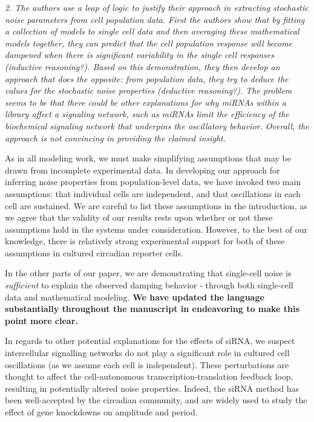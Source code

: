 \documentclass[11pt, letterpaper]{article}
\newenvironment{reviewer}{\itshape\color{gray}}{}
\begin{document}
\begin{reviewer}
2. The authors use a leap of logic to justify their approach in extracting stochastic noise parameters from cell population data. First the authors show that by fitting a collection of models to single cell data and then averaging these mathematical models together, they can predict that the cell population response will become dampened when there is significant variability in the single cell responses (inductive reasoning?). Based on this demonstration, they then develop an approach that does the opposite: from population data, they try to deduce the values for the stochastic noise properties (deductive reasoning?). The problem seems to be that there could be other explanations for why miRNAs within a library affect a signaling network, such as miRNAs limit the efficiency of the biochemical signaling network that underpins the oscillatory behavior. Overall, the approach is not convincing in providing the claimed insight. 
\end{reviewer}

As in all modeling work, we must make simplifying assumptions that may be drawn from incomplete experimental data.
In developing our approach for inferring noise properties from population-level data, we have invoked two main assumptions: that individual cells are independent, and that oscillations in each cell are sustained.
We are careful to list these assumptions in the introduction, as we agree that the validity of our results rests upon whether or not these assumptions hold in the systems under consideration.
However, to the best of our knowledge, there is relatively strong experimental support for both of these assumptions in cultured circadian reporter cells.

In the other parts of our paper, we are demonstrating that single-cell noise is {\itshape sufficient} to explain the observed damping behavior - through both single-cell data and mathematical modeling.
{\bfseries We have updated the language substantially throughout the manuscript in endeavoring to make this point more clear.}

In regards to other potential explanations for the effects of siRNA, we suspect intercellular signalling networks do not play a significant role in cultured cell oscillations (as we assume each cell is independent).
These perturbations are thought to affect the cell-autonomous transcription-translation feedback loop, resulting in potentially altered noise properties.
Indeed, the siRNA method has been well-accepted by the circadian community, and are widely used to study the effect of gene knockdowns on amplitude and period.
\end{document}
